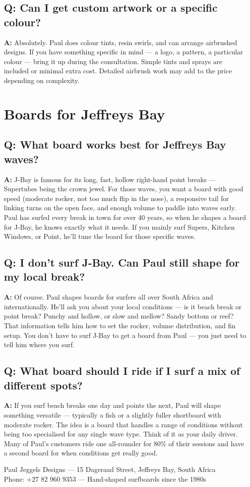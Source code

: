 \documentclass[11pt,a4paper]{article}
\newcommand{\question}[1]{\subsection*{Q: #1}}
\newcommand{\answer}{\noindent\textbf{A:} }
\begin{document}
\question{Can I get custom artwork or a specific colour?}
\answer Absolutely. Paul does colour tints, resin swirls, and can arrange airbrushed designs. If you have something specific in mind --- a logo, a pattern, a particular colour --- bring it up during the consultation. Simple tints and sprays are included or minimal extra cost. Detailed airbrush work may add to the price depending on complexity.

\section{Boards for Jeffreys Bay}

\question{What board works best for Jeffreys Bay waves?}
\answer J-Bay is famous for its long, fast, hollow right-hand point breaks --- Supertubes being the crown jewel. For those waves, you want a board with good speed (moderate rocker, not too much flip in the nose), a responsive tail for linking turns on the open face, and enough volume to paddle into waves early. Paul has surfed every break in town for over 40 years, so when he shapes a board for J-Bay, he knows exactly what it needs. If you mainly surf Supers, Kitchen Windows, or Point, he'll tune the board for those specific waves.

\question{I don't surf J-Bay. Can Paul still shape for my local break?}
\answer Of course. Paul shapes boards for surfers all over South Africa and internationally. He'll ask you about your local conditions --- is it beach break or point break? Punchy and hollow, or slow and mellow? Sandy bottom or reef? That information tells him how to set the rocker, volume distribution, and fin setup. You don't have to surf J-Bay to get a board from Paul --- you just need to tell him where you surf.

\question{What board should I ride if I surf a mix of different spots?}
\answer If you surf beach breaks one day and points the next, Paul will shape something versatile --- typically a fish or a slightly fuller shortboard with moderate rocker. The idea is a board that handles a range of conditions without being too specialised for any single wave type. Think of it as your daily driver. Many of Paul's customers ride one all-rounder for 80\% of their sessions and have a second board for when conditions get really good.

\vfill
\begin{center}
\small\color{gray}
Paul Jeggels Designs --- 15 Dageraad Street, Jeffreys Bay, South Africa\\
Phone: +27 82 960 9353 --- Hand-shaped surfboards since the 1980s
\end{center}
\end{document}
